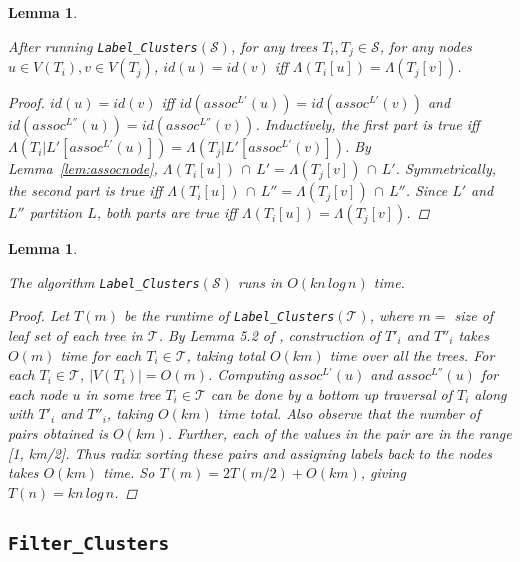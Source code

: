 \documentclass{article}
\newcommand{\leafset}{\Lambda}
\newtheorem{labelclusterscorrectness}[incompatibility]{Lemma}
\newtheorem{labelclustersruntime}[incompatibility]{Lemma}
\begin{document}
    \begin{labelclusterscorrectness}
        \label{lem:labelclusterscorrectness}

        After running \texttt{Label\_Clusters}$(\mathcal{S})$, for any trees $T_i, T_j \in \mathcal{S}$, for any nodes $u \in V(T_i), v \in V(T_j)$, $id(u) = id(v)$ iff $\leafset(T_i[u]) = \leafset(T_j[v])$.

        \begin{proof}
            $id(u) = id(v)$ iff $id(assoc^{L'}(u)) = id(assoc^{L'}(v))$ and $id(assoc^{L''}(u)) = id(assoc^{L''}(v))$. Inductively, the first part is true iff $\leafset(T_i|L'[assoc^{L'}(u)]) = \leafset(T_j|L'[assoc^{L'}(v)])$. By Lemma~\ref{lem:assocnode}, $\leafset(T_i[u])\, \cap\, L' = \leafset(T_j[v])\, \cap\, L'$. Symmetrically, the second part is true iff $\leafset(T_i[u])\, \cap\, L'' = \leafset(T_j[v])\, \cap\, L''$. Since $L'$ and $L''$ partition $L$, both parts are true iff $\leafset(T_i[u]) = \leafset(T_j[v])$.
        \end{proof}
    \end{labelclusterscorrectness}

    \begin{labelclustersruntime}
        \label{lem:labelclustersruntime}

        The algorithm \texttt{Label\_Clusters}$(\mathcal{S})$ runs in $O(kn\,log\,n)$ time.

        \begin{proof}
            Let $T(m)$ be the runtime of \texttt{Label\_Clusters}$(\mathcal{T})$, where $m =$ size of leaf set of each tree in $\mathcal{T}$. By Lemma 5.2 of \cite{farach1995fast}, construction of $T'_i$ and $T''_i$ takes $O(m)$ time for each $T_i \in \mathcal{T}$, taking total $O(km)$ time over all the trees. For each $T_i \in \mathcal{T}$, $|V(T_i)| = O(m)$. Computing $assoc^{L'}(u)$ and $assoc^{L''}(u)$ for each node $u$ in some tree $T_i \in \mathcal{T}$ can be done by a bottom up traversal of $T_i$ along with $T'_i$ and $T''_i$, taking $O(km)$ time total. Also observe that the number of pairs obtained is $O(km)$. Further, each of the values in the pair are in the range [1, km/2]. Thus radix sorting these pairs and assigning labels back to the nodes takes $O(km)$ time. So $T(m) = 2T(m/2) + O(km)$, giving $T(n) = kn\,log\,n$.
        \end{proof}
    \end{labelclustersruntime}

    \subsection{\texttt{Filter\_Clusters}}
\end{document}
